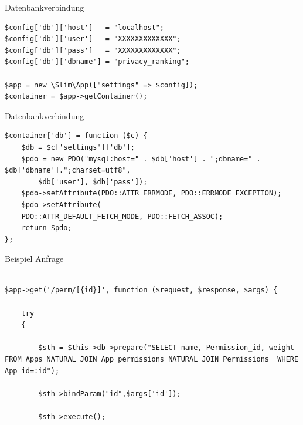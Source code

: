 \documentclass[compress,t]{beamer}
\begin{document}
\begin {frame}[fragile]{Datenbankverbindung}

    \begin{center}
        \begin{lstlisting}
$config['db']['host']   = "localhost";
$config['db']['user']   = "XXXXXXXXXXXXX";
$config['db']['pass']   = "XXXXXXXXXXXXX";
$config['db']['dbname'] = "privacy_ranking";

$app = new \Slim\App(["settings" => $config]);
$container = $app->getContainer();
        \end{lstlisting}
    \end{center}

\end{frame}

\begin {frame}[fragile]{Datenbankverbindung}

    \begin{center}
        \begin{lstlisting}
$container['db'] = function ($c) {
    $db = $c['settings']['db'];
    $pdo = new PDO("mysql:host=" . $db['host'] . ";dbname=" . $db['dbname'].";charset=utf8",
        $db['user'], $db['pass']);
    $pdo->setAttribute(PDO::ATTR_ERRMODE, PDO::ERRMODE_EXCEPTION);
    $pdo->setAttribute(
    PDO::ATTR_DEFAULT_FETCH_MODE, PDO::FETCH_ASSOC);
    return $pdo;
};

        \end{lstlisting}
    \end{center}

\end{frame}

\begin {frame}[fragile]{Beispiel Anfrage}

    \begin{center}
        \begin{lstlisting}

$app->get('/perm/[{id}]', function ($request, $response, $args) {

    try
    {

        $sth = $this->db->prepare("SELECT name, Permission_id, weight  FROM Apps NATURAL JOIN App_permissions NATURAL JOIN Permissions  WHERE App_id=:id");

        $sth->bindParam("id",$args['id']);

        $sth->execute();

        \end{lstlisting}
    \end{center}

\end{frame}
\end{document}
